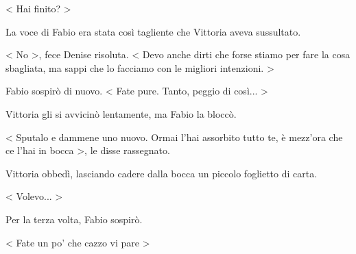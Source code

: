 < Hai finito? >

La voce di Fabio era stata così tagliente che Vittoria aveva sussultato.

< No >, fece Denise risoluta. < Devo anche dirti che forse stiamo per fare la cosa sbagliata, ma sappi che lo facciamo con le migliori intenzioni. >

Fabio sospirò di nuovo. < Fate pure. Tanto, peggio di così... >

Vittoria gli si avvicinò lentamente, ma Fabio la bloccò.

< Sputalo e dammene uno nuovo. Ormai l'hai assorbito tutto te, è mezz'ora che ce l'hai in bocca >, le disse rassegnato.

Vittoria obbedì, lasciando cadere dalla bocca un piccolo foglietto di carta.

< Volevo... >

Per la terza volta, Fabio sospirò.

< Fate un po' che cazzo vi pare >
